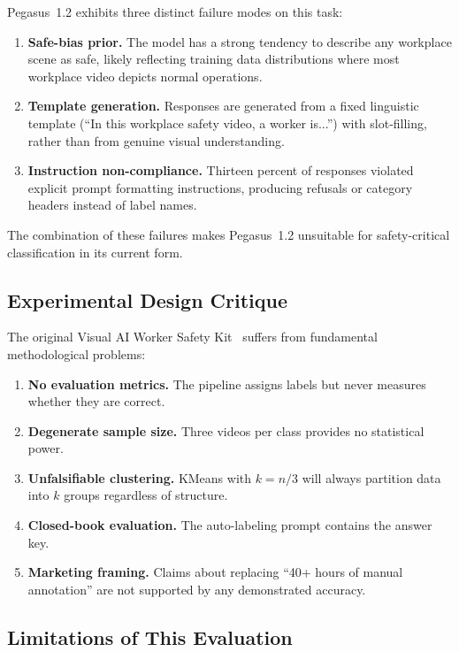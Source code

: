\documentclass[11pt,a4paper]{article}
\begin{document}
Pegasus~1.2 exhibits three distinct failure modes on this task:

\begin{enumerate}
    \item \textbf{Safe-bias prior.} The model has a strong tendency to describe any workplace scene as safe, likely reflecting training data distributions where most workplace video depicts normal operations.

    \item \textbf{Template generation.} Responses are generated from a fixed linguistic template (``In this workplace safety video, a worker is...'') with slot-filling, rather than from genuine visual understanding.

    \item \textbf{Instruction non-compliance.} Thirteen percent of responses violated explicit prompt formatting instructions, producing refusals or category headers instead of label names.
\end{enumerate}

The combination of these failures makes Pegasus~1.2 unsuitable for safety-critical classification in its current form.

\subsection{Experimental Design Critique}

The original Visual AI Worker Safety Kit~\cite{workersafetykit} suffers from fundamental methodological problems:

\begin{enumerate}
    \item \textbf{No evaluation metrics.} The pipeline assigns labels but never measures whether they are correct.
    \item \textbf{Degenerate sample size.} Three videos per class provides no statistical power.
    \item \textbf{Unfalsifiable clustering.} KMeans with $k{=}n/3$ will always partition data into $k$ groups regardless of structure.
    \item \textbf{Closed-book evaluation.} The auto-labeling prompt contains the answer key.
    \item \textbf{Marketing framing.} Claims about replacing ``40+ hours of manual annotation'' are not supported by any demonstrated accuracy.
\end{enumerate}

\subsection{Limitations of This Evaluation}
\end{document}
